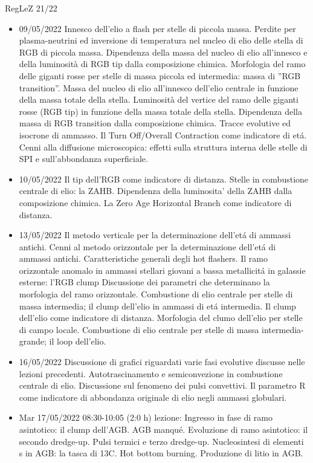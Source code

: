 \begin{frame}[allowframebreaks]{RegLeZ 21/22}
\begin{itemize}
\item 09/05/2022 Innesco dell'elio a flash per stelle di piccola massa. Perdite per plasma-neutrini ed inversione di temperatura nel nucleo di elio delle stella di RGB di piccola massa. Dipendenza della massa del nucleo di elio all'innesco e della luminosità di RGB tip dalla composizione chimica. Morfologia del ramo delle giganti rosse per stelle di massa piccola ed intermedia: massa di ''RGB transition''. Massa del nucleo di elio all'innesco dell'elio centrale in funzione della massa totale della stella. Luminosità del vertice del ramo delle giganti rosse (RGB tip) in funzione della massa totale della stella. Dipendenza della massa di RGB transition dalla composizione chimica. Tracce evolutive ed isocrone di ammasso. Il Turn Off/Overall Contraction come indicatore di et\'a. Cenni alla diffusione microscopica: effetti sulla struttura interna delle stelle di SPI e sull'abbondanza superficiale.
\item 10/05/2022 Il tip dell'RGB come indicatore di distanza. Stelle in combustione centrale di elio: la ZAHB. Dipendenza della luminosita' della ZAHB dalla composizione chimica. La Zero Age Horizontal Branch come indicatore di distanza.
\item 13/05/2022 Il metodo verticale per la determinazione dell'et\'a di ammassi antichi. Cenni al metodo orizzontale per la determinazione dell'et\'a di ammassi antichi. Caratteristiche generali degli hot flashers. Il ramo orizzontale anomalo in ammassi stellari giovani a bassa metallicit\'a in galassie esterne: l'RGB clump Discussione dei parametri che determinano la morfologia del ramo orizzontale. Combustione di elio centrale per stelle di massa intermedia; il clump dell'elio in ammassi di et\'a intermedia. Il clump dell'elio come indicatore di distanza. Morfologia del clumo dell'elio per stelle di campo locale. Combustione di elio centrale per stelle di massa intermedia-grande; il loop dell'elio.
\item 16/05/2022 Discussione di grafici riguardati varie fasi evolutive discusse nelle lezioni precedenti. Autotrascinamento e semiconvezione in combustione centrale di elio. Discussione sul fenomeno dei pulsi convettivi. Il parametro R come indicatore di abbondanza originale di elio negli ammassi globulari.
\item Mar 17/05/2022 08:30-10:05 (2:0 h) lezione: Ingresso in fase di ramo asintotico: il clump dell'AGB. AGB manqu\'e. Evoluzione di ramo asintotico: il secondo dredge-up. Pulsi termici e terzo dredge-up. Nucleosintesi di elementi s in AGB: la tasca di 13C. Hot bottom burning. Produzione di litio in AGB.

\end{itemize}
\end{frame}

